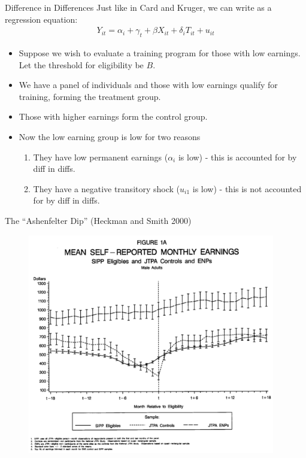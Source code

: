 \documentclass[xcolor=pdftex,dvipsnames,table,mathserif,aspectratio=169]{beamer}
\begin{document}
\begin{frame}{Difference in Differences}
Just like in Card and Kruger, we can write as a regression equation:
\begin{align*}
 Y_{it} =\alpha_i +\gamma_t +\beta X_{it} + \delta_i T_{it}  + u_{it}
 \end{align*}
\begin{itemize}
\item Suppose we wish to evaluate a training program for those with low
earnings. Let the threshold for eligibility be $B$.
\item We have a panel of individuals and those with low earnings qualify for
training, forming the treatment group.
\item Those with higher earnings form the control group. 
\item Now the low earning group is low for two reasons
\begin{enumerate}
\item They have low permanent earnings ($\alpha_i$ is low) - this is accounted for by diff in diffs.
\item They have a negative transitory shock ($u_{i1}$ is low) - this is not accounted for by diff in diffs.
\end{enumerate} 
\end{itemize}
\end{frame} 

\begin{frame}{The ``Ashenfelter Dip'' (Heckman and Smith 2000)}
\begin{figure}
\centering
\includegraphics[width=4.25in]{./resources/ashenfelter_dip.png}
\end{figure}
\end{frame}
\end{document}
